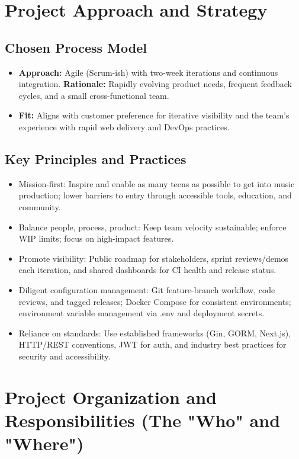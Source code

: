 \documentclass[12pt,a4paper]{article}
\begin{document}
\section{Project Approach and Strategy}

\subsection{Chosen Process Model}
\begin{itemize}
\item \textbf{Approach:} Agile (Scrum-ish) with two-week iterations and continuous integration. \textbf{Rationale:} Rapidly evolving product needs, frequent feedback cycles, and a small cross-functional team.
\item \textbf{Fit:} Aligns with customer preference for iterative visibility and the team's experience with rapid web delivery and DevOps practices.
\end{itemize}

\subsection{Key Principles and Practices}
\begin{itemize}
\item Mission-first: Inspire and enable as many teens as possible to get into music production; lower barriers to entry through accessible tools, education, and community.
\item Balance people, process, product: Keep team velocity sustainable; enforce WIP limits; focus on high-impact features.
\item Promote visibility: Public roadmap for stakeholders, sprint reviews/demos each iteration, and shared dashboards for CI health and release status.
\item Diligent configuration management: Git feature-branch workflow, code reviews, and tagged releases; Docker Compose for consistent environments; environment variable management via .env and deployment secrets.
\item Reliance on standards: Use established frameworks (Gin, GORM, Next.js), HTTP/REST conventions, JWT for auth, and industry best practices for security and accessibility.
\end{itemize}

\section{Project Organization and Responsibilities (The "Who" and "Where")}
\end{document}

